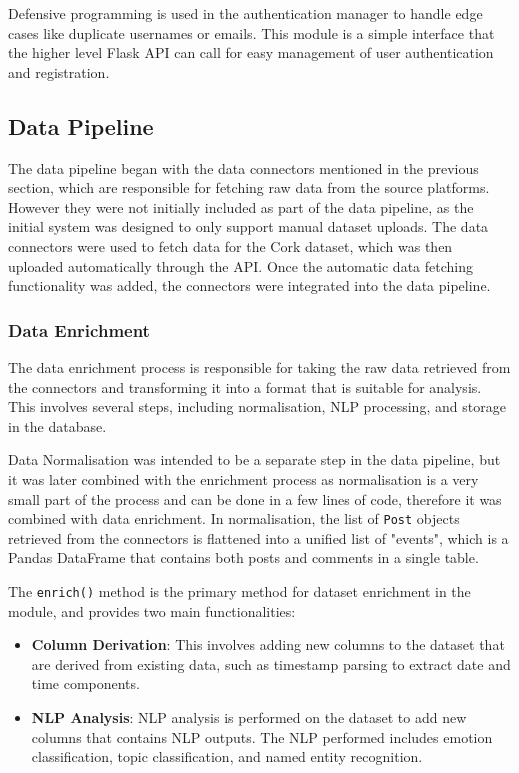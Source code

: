 \documentclass[12pt, a4paper]{article}
\begin{document}
Defensive programming is used in the authentication manager to handle edge cases like duplicate usernames or emails. This module is a simple interface that the higher level Flask API can call for easy management of user authentication and registration.

\subsection{Data Pipeline}
The data pipeline began with the data connectors mentioned in the previous section, which are responsible for fetching raw data from the source platforms. However they were not initially included as part of the data pipeline, as the initial system was designed to only support manual dataset uploads. The data connectors were used to fetch data for the Cork dataset, which was then uploaded automatically through the API. Once the automatic data fetching functionality was added, the connectors were integrated into the data pipeline.

\subsubsection{Data Enrichment}
The data enrichment process is responsible for taking the raw data retrieved from the connectors and transforming it into a format that is suitable for analysis. This involves several steps, including normalisation, NLP processing, and storage in the database.

Data Normalisation was intended to be a separate step in the data pipeline, but it was later combined with the enrichment process as normalisation is a very small part of the process and can be done in a few lines of code, therefore it was combined with data enrichment. In normalisation, the list of \texttt{Post} objects retrieved from the connectors is flattened into a unified list of "events", which is a Pandas DataFrame that contains both posts and comments in a single table.

The \texttt{enrich()} method is the primary method for dataset enrichment in the module, and provides two main functionalities:
\begin{itemize}
    \item \textbf{Column Derivation}: This involves adding new columns to the dataset that are derived from existing data, such as timestamp parsing to extract date and time components.
    \item \textbf{NLP Analysis}: NLP analysis is performed on the dataset to add new columns that contains NLP outputs. The NLP performed includes emotion classification, topic classification, and named entity recognition.
\end{itemize}
\end{document}
